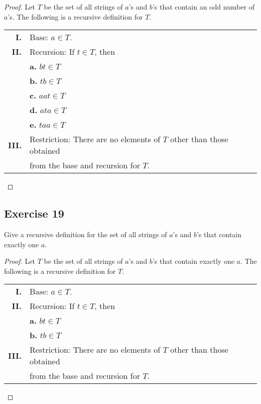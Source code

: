 \documentclass[14pt]{extarticle}
\begin{document}
\begin{proof}
    Let $T$ be the set of all strings of $a$’s and $b$’s that contain an odd number of $a$’s.
    The following is a recursive definition for $T$.

    \begin{tabular}{rl}
        {\bf I.}   & Base: $a \in T$.                                                    \\
        {\bf II.}  & Recursion: If $t \in T$, then                                       \\
                   & {\bf a.} $bt \in T$                                                 \\
                   & {\bf b.} $tb \in T$                                                 \\
                   & {\bf c.} $aat \in T$                                                \\
                   & {\bf d.} $ata \in T$                                                \\
                   & {\bf e.} $taa \in T$                                                \\
        {\bf III.} & Restriction: There are no elements of $T$ other than those obtained \\
                   & from the base and recursion for $T$.
    \end{tabular}
\end{proof}

\subsection{Exercise 19}
Give a recursive definition for the set of all strings of $a$’s and $b$’s that contain exactly one $a$.

\begin{proof}
    Let $T$ be the set of all strings of $a$’s and $b$’s that contain exactly one $a$.
    The following is a recursive definition for $T$.

    \begin{tabular}{rl}
        {\bf I.}   & Base: $a \in T$.                                                    \\
        {\bf II.}  & Recursion: If $t \in T$, then                                       \\
                   & {\bf a.} $bt \in T$                                                 \\
                   & {\bf b.} $tb \in T$                                                 \\
        {\bf III.} & Restriction: There are no elements of $T$ other than those obtained \\
                   & from the base and recursion for $T$.
    \end{tabular}
\end{proof}
\end{document}
